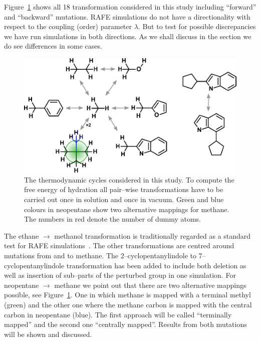 \documentclass[journal=jctcce,manuscript=article]{achemso}
\begin{document}
Figure~\ref{fig:cycles} shows all 18 transformation considered in this
study including ``forward'' and ``backward'' mutations.  RAFE
simulations do not have a directionality with respect to the coupling (order) 
parameter $\lambda$.  But to test for possible discrepancies we have run 
simulations in both directions.  As we shall discuss in the 
 section we do see differences in some cases.
\begin{figure}[ht]
  \includegraphics[scale=1.0]{figures/cycles.pdf}
  \caption{The thermodynamic cycles considered in this study.  To
    compute the free energy of hydration all pair--wise
    transformations have to be carried out once in solution and once
    in vacuum.  Green and blue colours in neopentane show two
    alternative mappings for methane.  The numbers in red denote the
    number of dummy atoms.}
  \label{fig:cycles}
\end{figure}

The ethane $\rightarrow$ methanol transformation is traditionally
regarded as a standard test for RAFE
simulations~\cite{doi:10.1063/1.449208, doi:10.1021/jp981629f}.  The
other transformations are centred around mutations from and to
methane.  The 2--cyclopentanylindole to 7--cyclopentanylindole
transformation has been added to include both deletion as well as
insertion of sub--parts of the perturbed group in one simulation.  For
neopentane $\rightarrow$ methane we point out that there are two
alternative mappings possible, see Figure~\ref{fig:cycles}.  One in
which methane is mapped with a terminal methyl (green) and the other
one where the methane carbon is mapped with the central carbon in
neopentane (blue).  The first approach will be called ``terminally mapped'' and 
the second one ``centrally mapped''. Results from both mutations will be shown 
and discussed.
\end{document}
